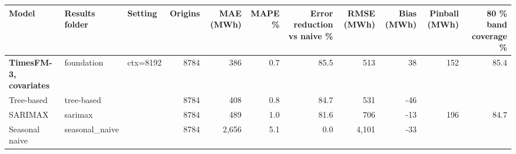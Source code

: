 \begin{tabular}{lllrrrrrrrr}
\toprule
Model & Results folder & Setting & Origins & MAE (MWh) & MAPE \% & Error reduction vs naive \% & RMSE (MWh) & Bias (MWh) & Pinball (MWh) & 80 \% band coverage \% \\
\midrule
\textbf{TimesFM-3, covariates} & foundation & ctx=8192 & 8784 & 386 & 0.7 & 85.5 & 513 & 38 & 152 & 85.4 \\
Tree-based & tree-based &  & 8784 & 408 & 0.8 & 84.7 & 531 & -46 &  &  \\
SARIMAX & sarimax &  & 8784 & 489 & 1.0 & 81.6 & 706 & -13 & 196 & 84.7 \\
Seasonal naive & seasonal\_naive &  & 8784 & 2,656 & 5.1 & 0.0 & 4,101 & -33 &  &  \\
\bottomrule
\end{tabular}
